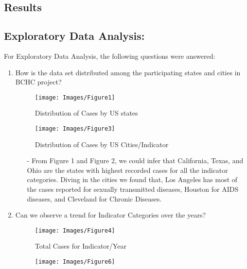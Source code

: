 \documentclass[11pt]{article}
\begin{document}
\begin{multicols}{2}
    \section{Results}
    \subsection{Exploratory Data Analysis: }
    For Exploratory Data Analysis, the following questions were answered:

    \begin{enumerate}
        \item How is the data set distributed among the participating states and cities in BCHC project?
        \begin{figure}[H]
            \centering
            \texttt{[image: Images/Figure1]}
            \vspace{-15pt}
            \caption{Distribution of Cases by US states}
        \end{figure}
        \vspace{-20pt}
        \begin{figure}[H]
            \centering
            \texttt{[image: Images/Figure3]}
            \vspace{-15pt}
            \caption{Distribution of Cases by US Cities/Indicator}
        \end{figure}
        \begin{itemize}
            \item[-] From Figure 1 and Figure 2, we could infer that California, Texas, and Ohio are the states with highest recorded cases for all the indicator categories. Diving in the cities we found that, Los Angeles has most of the cases reported for sexually transmitted diseases, Houston for AIDS diseases, and Cleveland for Chronic Diseases.
        \end{itemize}
        \item Can we observe a trend for Indicator Categories over the years? 
        \begin{figure}[H]
            \centering
            \texttt{[image: Images/Figure4]}
            \vspace{-15pt}
            \caption{Total Cases for Indicator/Year}
        \end{figure}
        \begin{figure}[H]
            \centering
            \texttt{[image: Images/Figure6]}
            \vspace{-15pt}

\end{figure}
\end{enumerate}
\end{multicols}
\end{document}
